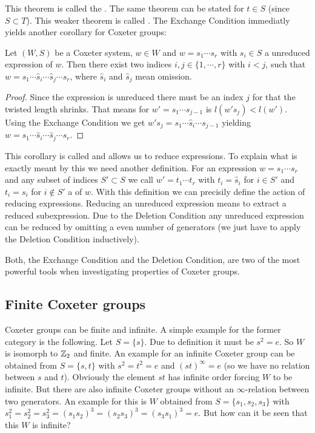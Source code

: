 This theorem is called the . The same theorem can be stated for $t \in S$ (since $S \subset T$). This weaker theorem is called . The Exchange Condition immediatly yields another corollary for Coxeter groups:

\begin{coro}
	\label{deletion-condition}
	Let $(W,S)$ be a Coxeter system, $w \in W$ and $w = s_1 \cdots s_r$ with $s_i \in S$ a unreduced expression of $w$. Then there exist two indices $i,j \in \{1,\cdots,r\}$ with $i < j$, such that $w = s_1 \cdots \hat s_i \cdots \hat s_j \cdots s_r$, where $\hat s_i$ and $\hat s_j$ mean omission.

	\begin{proof}
		Since the expression is unreduced there must be an index $j$ for that the twisted length shrinks. That means for $w' = s_1 \cdots s_{j-1}$ is $l(w' s_j) < l(w')$. Using the Exchange Condition we get $w' s_j = s_1 \cdots \hat s_i \cdots s_{j-1}$ yielding $w = s_1 \cdots \hat s_i \cdots \hat s_j \cdots s_r$.
	\end{proof}
\end{coro}

This corollary is called  and allows us to reduce expressions. To explain what is exactly meant by this we need another definition. For an expression $w = s_1 \cdots s_r$ and any subset of indices $S' \subset S$ we call $w' = t_1 \cdots t_r$ with $t_i = \hat s_i$ for $i \in S'$ and $t_i = s_i$ for $i \notin S'$ a  of $w$. With this definition we can precisily define the action of reducing expressions. Reducing an unreduced expression means to extract a reduced subexpression. Due to the Deletion Condition any unreduced expression can be reduced by omitting a even number of generators (we just have to apply the Deletion Condition inductively).

Both, the Exchange Condition and the Deletion Condition, are two of the most powerful tools when investigating properties of Coxeter groups.

\subsection{Finite Coxeter groups}

Coxeter groups can be finite and infinite. A simple example for the former category is the following. Let $S = \{ s \}$. Due to definition it must be $s^2 = e$. So $W$ is isomorph to $\mathbb{Z}_2$ and finite. An example for an infinite Coxeter group can be obtained from $S = \{s,t\}$ with $s^2=t^2=e$ and $(st)^\infty = e$ (so we have no relation between $s$ and $t$). Obviously the element $st$ has infinite order forcing $W$ to be infinite. But there are also infinite Coxeter groups without an $\infty$-relation between two generators. An example for this is $W$ obtained from $S=\{s_1,s_2,s_3\}$ with $s_1^2=s_2^2=s_3^2=(s_1 s_2)^3=(s_2 s_3)^3=(s_3 s_1)^3=e$. But how can it be seen that this $W$ is infinite?

